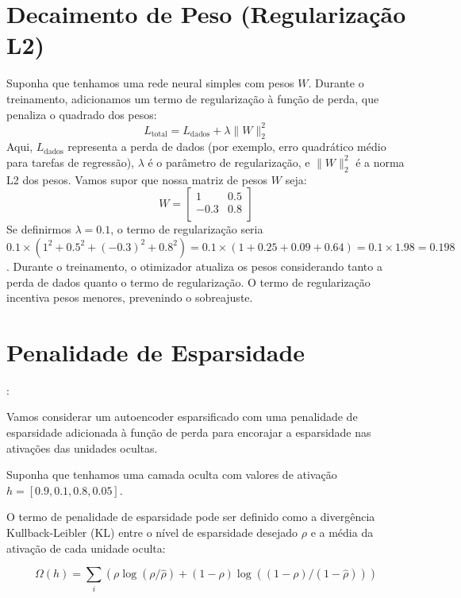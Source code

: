 \begin{apendicesenv}
	\section{Decaimento de Peso (Regularização L2)}
		\label{Apend:regularization}
		\par Suponha que tenhamos uma rede neural simples com pesos \( W \). Durante o treinamento, adicionamos um termo de regularização à função de perda, que penaliza o quadrado dos pesos:
		\begin{equation}
			L_{\text{total}} = L_{\text{dados}} + \lambda \|W\|^2_2
		\end{equation}
		Aqui, \( L_{\text{dados}} \) representa a perda de dados (por exemplo, erro quadrático médio para tarefas de regressão), \( \lambda \) é o parâmetro de regularização, e \( \|W\|^2_2 \) é a norma L2 dos pesos.
		Vamos supor que nossa matriz de pesos \( W \) seja:
		\[ W = \begin{bmatrix} 
			1 & 0.5 \\
			-0.3 & 0.8 \\
		\end{bmatrix} \]
		Se definirmos \( \lambda = 0.1 \), o termo de regularização seria \( 0.1 \times (1^2 + 0.5^2 + (-0.3)^2 + 0.8^2) = 0.1 \times (1 + 0.25 + 0.09 + 0.64) = 0.1 \times 1.98 = 0.198 \).
		Durante o treinamento, o otimizador atualiza os pesos considerando tanto a perda de dados quanto o termo de regularização. O termo de regularização incentiva pesos menores, prevenindo o sobreajuste.

	\section{Penalidade de Esparsidade}:
		\par Vamos considerar um autoencoder esparsificado com uma penalidade de esparsidade adicionada à função de perda para encorajar a esparsidade nas ativações das unidades ocultas.


		\par Suponha que tenhamos uma camada oculta com valores de ativação \( h = [0.9, 0.1, 0.8, 0.05] \).

		\par O termo de penalidade de esparsidade pode ser definido como a divergência Kullback-Leibler (KL) entre o nível de esparsidade desejado \( \rho \) e a média da ativação de cada unidade oculta:
			
		\begin{equation}
			\Omega(h) = \sum_i (\rho \log(\rho / \hat{\rho}) + (1 - \rho) \log((1 - \rho) / (1 - \hat{\rho})))
		\end{equation}
		

\end{apendicesenv}
